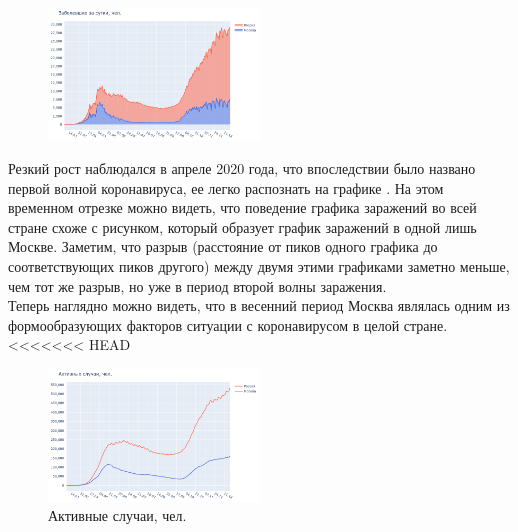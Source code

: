 \documentclass[a4paper, 12pt]{extarticle}
\begin{document}
\begin{figure}
    \vspace{-20pt}
    \centering
    \includegraphics[width=0.50\textwidth]{../plots/1day_confirmed_russia_moscow.png}
    \vspace{-20pt}
    \label{fig:day_confirmed_russia_moscow}
\end{figure}

Резкий рост наблюдался в апреле 2020 года,
что впоследствии было названо первой волной коронавируса, ее легко распознать
на графике . На этом временном отрезке можно видеть, что поведение
графика заражений во всей стране схоже с рисунком, который образует график
заражений в одной лишь Москве. Заметим, что разрыв (расстояние от пиков одного графика до
соответствующих пиков другого) между двумя этими графиками заметно меньше, чем
тот же разрыв, но уже в период второй волны заражения.
\\

Теперь наглядно можно видеть, что
в весенний период Москва являлась одним из формообразующих факторов ситуации с
коронавирусом в целой стране.
\\

<<<<<<< HEAD
\begin{figure}
    \vspace{-20pt}
    \centering
    \includegraphics[width=0.50\textwidth]{../plots/2active_cases_russia_moscow.png}
    \vspace{-20pt}
    \caption{Активные случаи, чел.}
    \vspace{-20pt}
    \label{fig:day_active_russia_moscow}
\end{figure}
\end{document}
